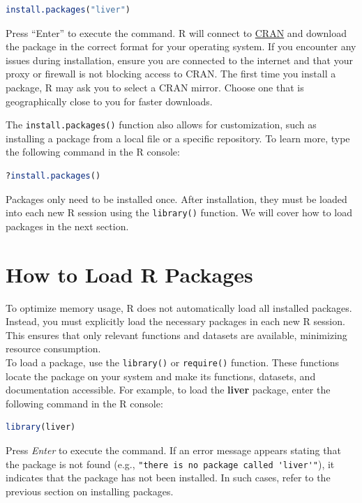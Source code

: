 \documentclass[
]{book}
\newcommand{\passthrough}[1]{#1}
\theoremstyle{definition}
\theoremstyle{definition}
\theoremstyle{definition}
\theoremstyle{definition}
\theoremstyle{remark}
\begin{document}
\begin{lstlisting}[language=R]
install.packages("liver")
\end{lstlisting}

Press ``Enter'' to execute the command. R will connect to \href{https://cran.r-project.org}{CRAN} and download the package in the correct format for your operating system. If you encounter any issues during installation, ensure you are connected to the internet and that your proxy or firewall is not blocking access to CRAN. The first time you install a package, R may ask you to select a CRAN mirror. Choose one that is geographically close to you for faster downloads.

The \passthrough{\lstinline!install.packages()!} function also allows for customization, such as installing a package from a local file or a specific repository. To learn more, type the following command in the R console:

\begin{lstlisting}[language=R]
?install.packages()
\end{lstlisting}

Packages only need to be installed once. After installation, they must be loaded into each new R session using the \passthrough{\lstinline!library()!} function. We will cover how to load packages in the next section.

\section{How to Load R Packages}\label{how-to-load-r-packages}

To optimize memory usage, R does not automatically load all installed packages. Instead, you must explicitly load the necessary packages in each new R session. This ensures that only relevant functions and datasets are available, minimizing resource consumption.\\
To load a package, use the \passthrough{\lstinline!library()!} or \passthrough{\lstinline!require()!} function. These functions locate the package on your system and make its functions, datasets, and documentation accessible. For example, to load the \textbf{liver} package, enter the following command in the R console:

\begin{lstlisting}[language=R]
library(liver)
\end{lstlisting}

Press \emph{Enter} to execute the command. If an error message appears stating that the package is not found (e.g., \passthrough{\lstinline!"there is no package called 'liver'"!}), it indicates that the package has not been installed. In such cases, refer to the previous section on installing packages.
\end{document}
